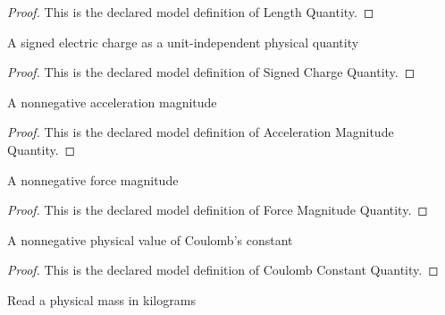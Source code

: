 \begin{proof}
  This is the declared model definition of Length Quantity.
\end{proof}
\begin{definition}
  \label{def:physics:phyx-mini-0901:phyxminiproblems-problemphyxmini0901-signedchargequantity}
  A signed electric charge as a unit-independent physical quantity
\end{definition}
\begin{proof}
  This is the declared model definition of Signed Charge Quantity.
\end{proof}
\begin{definition}
  \label{def:physics:phyx-mini-0901:phyxminiproblems-problemphyxmini0901-accelerationmagnitudequantity}
  A nonnegative acceleration magnitude
\end{definition}
\begin{proof}
  This is the declared model definition of Acceleration Magnitude Quantity.
\end{proof}
\begin{definition}
  \label{def:physics:phyx-mini-0901:phyxminiproblems-problemphyxmini0901-forcemagnitudequantity}
  A nonnegative force magnitude
\end{definition}
\begin{proof}
  This is the declared model definition of Force Magnitude Quantity.
\end{proof}
\begin{definition}
  \label{def:physics:phyx-mini-0901:phyxminiproblems-problemphyxmini0901-coulombconstantquantity}
  A nonnegative physical value of Coulomb's constant
\end{definition}
\begin{proof}
  This is the declared model definition of Coulomb Constant Quantity.
\end{proof}
\begin{definition}
  \label{def:physics:phyx-mini-0901:phyxminiproblems-problemphyxmini0901-massinkilograms}
  Read a physical mass in kilograms
\end{definition}
